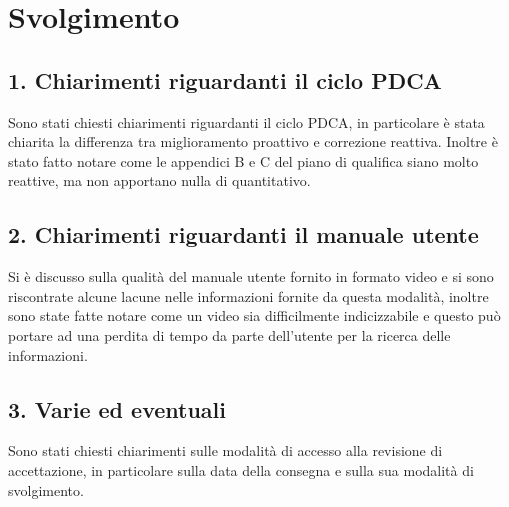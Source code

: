 \newpage
\section*{Svolgimento}
	\subsection*{1. Chiarimenti riguardanti il ciclo PDCA}
	Sono stati chiesti chiarimenti riguardanti il ciclo PDCA, in particolare è stata chiarita la differenza tra miglioramento proattivo e correzione reattiva. Inoltre è stato fatto notare come le appendici B e C del piano di qualifica siano molto reattive, ma non apportano nulla di quantitativo.


	\subsection*{2. Chiarimenti riguardanti il manuale utente}

		Si è discusso sulla qualità del manuale utente fornito in formato video e si sono riscontrate alcune lacune nelle informazioni fornite da questa modalità, inoltre sono state fatte notare come un video sia difficilmente indicizzabile e questo può portare ad una perdita di tempo da parte dell'utente per la ricerca delle informazioni.

	\subsection*{3. Varie ed eventuali}

		Sono stati chiesti chiarimenti sulle modalità di accesso alla revisione di accettazione, in particolare sulla data della consegna e sulla sua modalità di svolgimento.
